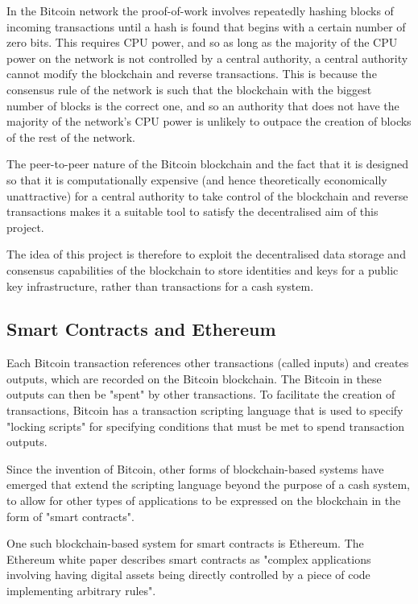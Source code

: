 \documentclass[12pt]{report}
\begin{document}
	In the Bitcoin network the proof-of-work involves repeatedly hashing blocks of incoming transactions until a hash is found that begins with a certain number of zero bits. This requires CPU power, and so as long as the majority of the CPU power on the network is not controlled by a central authority, a central authority cannot modify the blockchain and reverse transactions. This is because the consensus rule of the network is such that the blockchain with the biggest number of blocks is the correct one, and so an authority that does not have the majority of the network's CPU power is unlikely to outpace the creation of blocks of the rest of the network.
	
	The peer-to-peer nature of the Bitcoin blockchain and the fact that it is designed so that it is computationally expensive (and hence theoretically economically unattractive) for a central authority to take control of the blockchain and reverse transactions makes it a suitable tool to satisfy the decentralised aim of this project.
	
	The idea of this project is therefore to exploit the decentralised data storage and consensus capabilities of the blockchain to store identities and keys for a public key infrastructure, rather than transactions for a cash system.
	
	\subsection{Smart Contracts and Ethereum}
	Each Bitcoin transaction references other transactions (called inputs) and creates outputs, which are recorded on the Bitcoin blockchain. The Bitcoin in these outputs can then be "spent" by other transactions. To facilitate the creation of transactions, Bitcoin has a transaction scripting language that is used to specify "locking scripts" for specifying conditions that must be met to spend transaction outputs.\cite{10}
	
	Since the invention of Bitcoin, other forms of blockchain-based systems have emerged that extend the scripting language beyond the purpose of a cash system, to allow for other types of applications to be expressed on the blockchain in the form of "smart contracts". 
	
	One such blockchain-based system for smart contracts is Ethereum. The Ethereum white paper describes smart contracts as "complex applications involving having digital assets being directly controlled by a piece of code implementing arbitrary rules".\cite{3}
	
\end{document}
